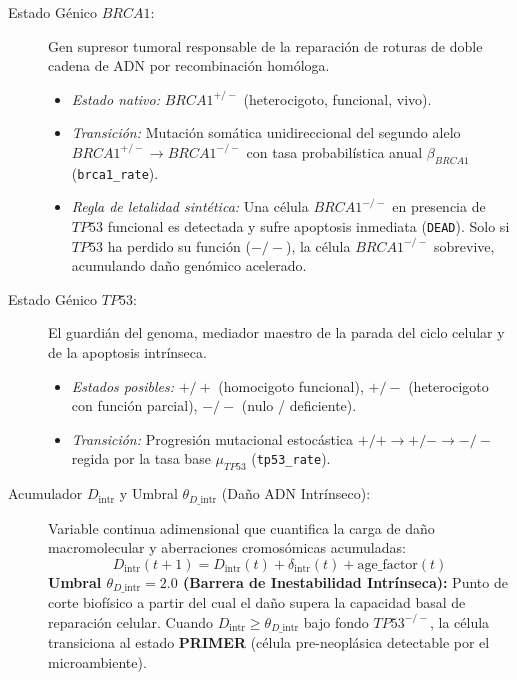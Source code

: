 \documentclass[10pt,a4paper]{article}
\begin{document}
\begin{description}
    \item[Estado Génico $BRCA1$:] Gen supresor tumoral responsable de la reparación de roturas de doble cadena de ADN por recombinación homóloga.
    \begin{itemize}
        \item \textit{Estado nativo:} $BRCA1^{+/-}$ (heterocigoto, funcional, vivo).
        \item \textit{Transición:} Mutación somática unidireccional del segundo alelo $BRCA1^{+/-} \to BRCA1^{-/-}$ con tasa probabilística anual $\beta_{BRCA1}$ (\texttt{brca1\_rate}).
        \item \textit{Regla de letalidad sintética:} Una célula $BRCA1^{-/-}$ en presencia de $TP53$ funcional es detectada y sufre apoptosis inmediata (\texttt{DEAD}). Solo si $TP53$ ha perdido su función ($-/-$), la célula $BRCA1^{-/-}$ sobrevive, acumulando daño genómico acelerado.
    \end{itemize}

    \item[Estado Génico $TP53$:] El guardián del genoma, mediador maestro de la parada del ciclo celular y de la apoptosis intrínseca.
    \begin{itemize}
        \item \textit{Estados posibles:} $+/+$ (homocigoto funcional), $+/-$ (heterocigoto con función parcial), $-/-$ (nulo / deficiente).
        \item \textit{Transición:} Progresión mutacional estocástica $+/+ \to +/- \to -/-$ regida por la tasa base $\mu_{TP53}$ (\texttt{tp53\_rate}).
    \end{itemize}

    \item[Acumulador $D_{\text{intr}}$ y Umbral $\theta_{D\text{\_intr}}$ (Daño ADN Intrínseco):] Variable continua adimensional que cuantifica la carga de daño macromolecular y aberraciones cromosómicas acumuladas:
    \begin{equation}
        D_{\text{intr}}(t+1) = D_{\text{intr}}(t) + \delta_{\text{intr}}(t) + \text{age\_factor}(t)
    \end{equation}
    \textbf{Umbral $\theta_{D\text{\_intr}} = 2.0$ (Barrera de Inestabilidad Intrínseca):} Punto de corte biofísico a partir del cual el daño supera la capacidad basal de reparación celular. Cuando $D_{\text{intr}} \ge \theta_{D\text{\_intr}}$ bajo fondo $TP53^{-/-}$, la célula transiciona al estado \textbf{PRIMER} (célula pre-neoplásica detectable por el microambiente).


\end{description}
\end{document}
